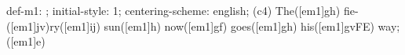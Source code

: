 def-m1: \grealign;
initial-style: 1;
centering-scheme: english;
(c4) The([em1]gh) fie-([em1]jv)ry([em1]ij) sun([em1]h) now([em1]gf) goes([em1]gh) his([em1]gvFE) way;([em1]e)